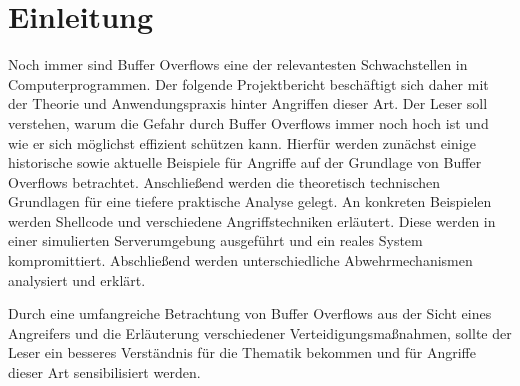 \section{Einleitung}
Noch immer sind Buffer Overflows eine der relevantesten Schwachstellen in Computerprogrammen.
Der folgende Projektbericht beschäftigt sich daher mit der Theorie und Anwendungspraxis hinter Angriffen dieser Art.
Der Leser soll verstehen, warum die Gefahr durch Buffer Overflows immer noch hoch ist und wie er sich möglichst effizient schützen kann.
Hierfür werden zunächst einige historische sowie aktuelle Beispiele für Angriffe auf der Grundlage von Buffer Overflows betrachtet.
Anschließend werden die theoretisch technischen Grundlagen für eine tiefere praktische Analyse gelegt.
An konkreten Beispielen werden Shellcode und verschiedene Angriffstechniken erläutert.
Diese werden in einer simulierten Serverumgebung ausgeführt und ein reales System kompromittiert.
Abschließend werden unterschiedliche Abwehrmechanismen analysiert und erklärt.

Durch eine umfangreiche Betrachtung von Buffer Overflows aus der Sicht eines Angreifers und die Erläuterung verschiedener Verteidigungsmaßnahmen,
sollte der Leser ein besseres Verständnis für die Thematik bekommen und für Angriffe dieser Art sensibilisiert werden.
